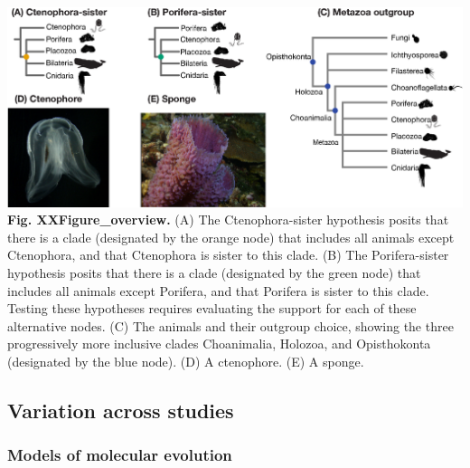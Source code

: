 \documentclass[]{article}
\begin{document}
\includegraphics{figures/Figure_overview.png} \textbf{Fig.
XXFigure\_overview.} (A) The Ctenophora-sister hypothesis posits that
there is a clade (designated by the orange node) that includes all
animals except Ctenophora, and that Ctenophora is sister to this clade.
(B) The Porifera-sister hypothesis posits that there is a clade
(designated by the green node) that includes all animals except
Porifera, and that Porifera is sister to this clade. Testing these
hypotheses requires evaluating the support for each of these alternative
nodes. (C) The animals and their outgroup choice, showing the three
progressively more inclusive clades Choanimalia, Holozoa, and
Opisthokonta (designated by the blue node). (D) A ctenophore. (E) A
sponge.

\hypertarget{variation-across-studies}{%
\subsection{Variation across studies}\label{variation-across-studies}}

\hypertarget{models-of-molecular-evolution}{%
\subsubsection{Models of molecular
evolution}\label{models-of-molecular-evolution}}
\end{document}
